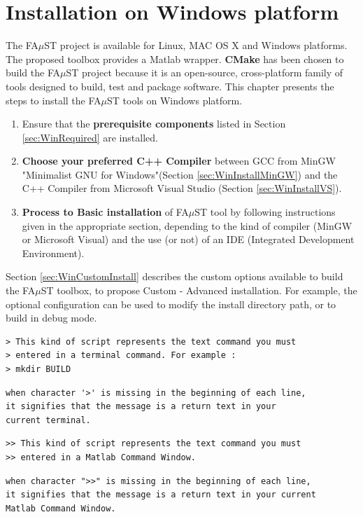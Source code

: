 \chapter{Installation on Windows platform}\label{sec:WinInstall}


The FA$\mu$ST project is available for Linux, MAC OS X and Windows platforms. The proposed toolbox provides a Matlab wrapper. \textbf{CMake} has been chosen to build the FA$\mu$ST project because it is an open-source, cross-platform family of tools designed to build, test and package software. This chapter presents the steps to install the FA$\mu$ST tools on Windows platform.

\begin{enumerate}
\item Ensure that the \textbf{prerequisite components} listed in Section \ref{sec:WinRequired} are installed. 

\item \textbf{Choose your preferred C++ Compiler} between GCC from MinGW "Minimalist GNU for Windows"(Section \ref{sec:WinInstallMinGW}) and the C++ Compiler from Microsoft Visual Studio (Section \ref{sec:WinInstallVS}). 

\item \textbf{Process to Basic installation} of FA$\mu$ST tool by following instructions given in the appropriate section, depending to the kind of compiler (MinGW or Microsoft Visual) and the use (or not) of an IDE (Integrated Development Environment). 
\end{enumerate}

Section \ref{sec:WinCustomInstall} describes the custom options available to build the FA$\mu$ST toolbox, to propose Custom - Advanced installation. For example, the optional configuration can be used to modify the install directory path, or to build in debug mode.  

\lstset{style=customBash}
\begin{lstlisting}
> This kind of script represents the text command you must 
> entered in a terminal command. For example : 
> mkdir BUILD 
\end{lstlisting}
\lstset{style=customBash}
\begin{lstlisting}
when character '>' is missing in the beginning of each line,
it signifies that the message is a return text in your
current terminal. 
\end{lstlisting}
\lstset{style=customMatlab}
\begin{lstlisting}
>> This kind of script represents the text command you must
>> entered in a Matlab Command Window. 
\end{lstlisting}
\lstset{style=customMatlab}
\begin{lstlisting}
when character ">>" is missing in the beginning of each line, 
it signifies that the message is a return text in your current 
Matlab Command Window. 
\end{lstlisting}


